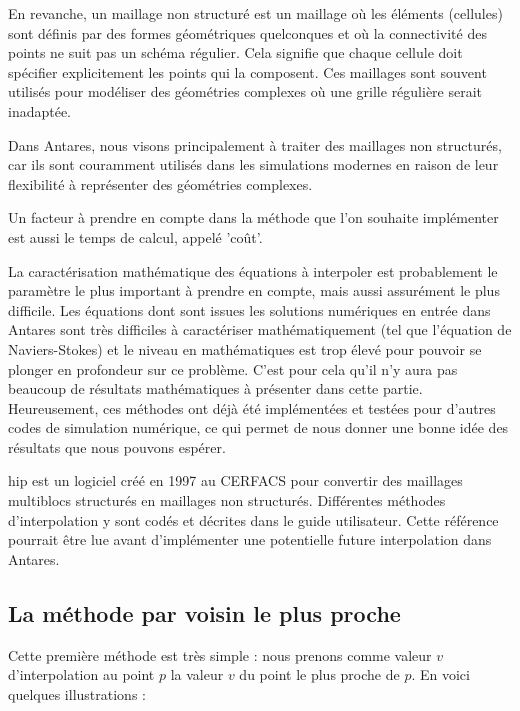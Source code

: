 En revanche, un maillage non structuré est un maillage où les éléments (cellules) sont définis par des formes géométriques quelconques et où la connectivité des points ne suit pas un schéma régulier. Cela signifie que chaque cellule doit spécifier explicitement les points qui la composent. Ces maillages sont souvent utilisés pour modéliser des géométries complexes où une grille régulière serait inadaptée.

Dans Antares, nous visons principalement à traiter des maillages non structurés, car ils sont couramment utilisés dans les simulations modernes en raison de leur flexibilité à représenter des géométries complexes.

Un facteur à prendre en compte dans la méthode que l'on souhaite implémenter est aussi le temps de calcul, appelé 'coût'.

La caractérisation mathématique des équations à interpoler est probablement le paramètre le plus important à prendre en compte, mais aussi assurément le plus difficile. Les équations dont sont issues les solutions numériques en entrée dans Antares sont très difficiles à caractériser mathématiquement (tel que l'équation de Naviers-Stokes) et le niveau en mathématiques est trop élevé pour pouvoir se plonger en profondeur sur ce problème\cite{gordont1971_2}. C'est pour cela qu'il n'y aura pas beaucoup de résultats mathématiques à présenter dans cette partie.
Heureusement, ces méthodes ont déjà été implémentées et testées pour d'autres codes de simulation numérique, ce qui permet de nous donner une bonne idée des résultats que nous pouvons espérer.


hip est un logiciel créé en 1997 au CERFACS pour convertir des maillages multiblocs structurés en maillages non structurés.
Différentes méthodes d'interpolation y sont codés et décrites dans le guide utilisateur\cite{muller2020}. Cette référence pourrait être lue avant d'implémenter une potentielle future interpolation dans Antares.


\subsection{La méthode par voisin le plus proche}
Cette première méthode est très simple : nous prenons comme valeur \( v \) d'interpolation au point \( p \) la valeur \( v \) du point le plus proche de \( p \).
En voici quelques illustrations :


